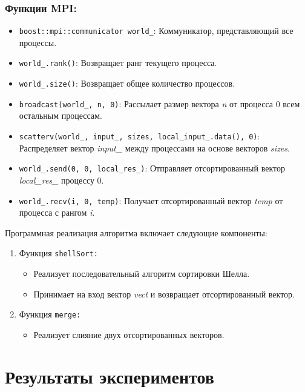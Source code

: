 \documentclass[12pt]{article}
\begin{document}
\subsubsection*{Функции MPI:}

\begin{itemize}
    \item \texttt{boost::mpi::communicator world\_}: Коммуникатор, представляющий все процессы.
    \item \texttt{world\_.rank()}: Возвращает ранг текущего процесса.
    \item \texttt{world\_.size()}: Возвращает общее количество процессов.
    \item \texttt{broadcast(world\_, n, 0)}: Рассылает размер вектора \textit{n} от процесса 0 всем остальным процессам.
    \item \texttt{scatterv(world\_, input\_, sizes, local\_input\_.data(), 0)}: Распределяет вектор \textit{input\_} между процессами на основе векторов \textit{sizes}.
    \item \texttt{world\_.send(0, 0, local\_res\_)}: Отправляет отсортированный вектор \textit{local\_res\_} процессу 0.
    \item \texttt{world\_.recv(i, 0, temp)}: Получает отсортированный вектор \textit{temp} от процесса с рангом \textit{i}.
\end{itemize}

\hspace*{1.25em}Программная реализация алгоритма включает следующие компоненты:

\begin{enumerate}
    \item Функция \texttt{shellSort:}
    \begin{itemize}
        \item Реализует последовательный алгоритм сортировки Шелла.
        \item Принимает на вход вектор \textit{vect} и возвращает отсортированный вектор.
    \end{itemize}
    \item Функция \texttt{merge:}
    \begin{itemize}
        \item Реализует слияние двух отсортированных векторов.
    \end{itemize}
\end{enumerate}

\section{Результаты экспериментов}
\end{document}
